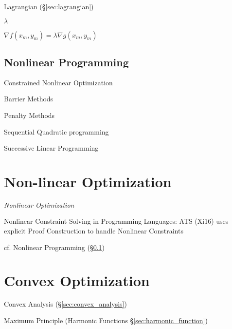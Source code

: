 \fist Lagrangian (\S\ref{sec:lagrangian})

$\lambda$

$\nabla f(x_m, y_m) = \lambda\nabla g(x_m, y_m)$



\subsection{Nonlinear Programming}\label{sec:nonlinear_programming}

Constrained Nonlinear Optimization

Barrier Methods

Penalty Methods

Sequential Quadratic programming

Successive Linear Programming



\section{Non-linear Optimization}\label{sec:nonlinear_optimization}


\emph{Nonlinear Optimization}

Nonlinear Constraint Solving in Programming Languages: ATS (Xi16) uses
explicit Proof Construction to handle Nonlinear Constraints

\fist cf. Nonlinear Programming (\S\ref{sec:nonlinear_programming})



\section{Convex Optimization}\label{sec:convex_optimization}

Convex Analysis (\S\ref{sec:convex_analysis})

Maximum Principle (Harmonic Functions \S\ref{sec:harmonic_function})



